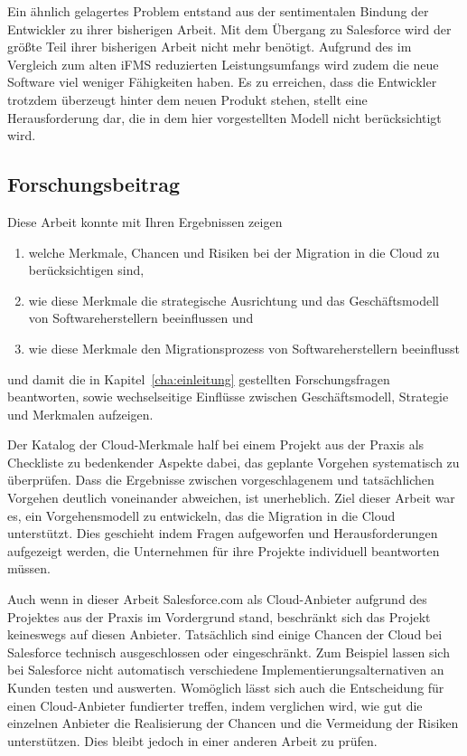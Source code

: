Ein ähnlich gelagertes Problem entstand aus der sentimentalen Bindung der 
Entwickler zu ihrer bisherigen Arbeit. Mit dem Übergang zu Salesforce wird der 
größte Teil ihrer bisherigen Arbeit nicht mehr benötigt. Aufgrund des im 
Vergleich zum alten iFMS reduzierten Leistungsumfangs wird zudem die neue 
Software viel weniger Fähigkeiten haben. Es zu erreichen, dass die Entwickler 
trotzdem überzeugt hinter dem neuen Produkt stehen, stellt eine Herausforderung 
dar, die in dem hier vorgestellten Modell nicht berücksichtigt wird.

\subsection{Forschungsbeitrag}
Diese Arbeit konnte mit Ihren Ergebnissen zeigen
\begin{enumerate}
	\item welche Merkmale, Chancen und Risiken bei der Migration in die 
Cloud zu berücksichtigen sind,
	\item wie diese Merkmale die strategische Ausrichtung und das 
Geschäftsmodell von Softwareherstellern beeinflussen und
	\item wie diese Merkmale den Migrationsprozess von Softwareherstellern 
beeinflusst
\end{enumerate}
und damit die in Kapitel~\ref{cha:einleitung} gestellten Forschungsfragen 
beantworten, sowie wechselseitige Einflüsse zwischen Geschäftsmodell, Strategie 
und Merkmalen aufzeigen.

Der Katalog der Cloud-Merkmale half bei einem Projekt aus der Praxis als 
Checkliste zu bedenkender Aspekte dabei, das geplante Vorgehen systematisch zu 
überprüfen. Dass die Ergebnisse zwischen vorgeschlagenem und tatsächlichen 
Vorgehen deutlich voneinander abweichen, ist unerheblich. Ziel dieser Arbeit war 
es, ein Vorgehensmodell zu entwickeln, das die Migration in die Cloud 
unterstützt. Dies geschieht indem Fragen aufgeworfen und Herausforderungen 
aufgezeigt werden, die Unternehmen für ihre Projekte individuell beantworten 
müssen. 

Auch wenn in dieser Arbeit Salesforce.com als Cloud-Anbieter aufgrund des 
Projektes aus der Praxis im Vordergrund stand, beschränkt sich das Projekt 
keineswegs auf diesen Anbieter. Tatsächlich sind einige Chancen der Cloud bei 
Salesforce technisch ausgeschlossen oder eingeschränkt. Zum Beispiel lassen 
sich bei Salesforce nicht automatisch verschiedene Implementierungsalternativen 
an Kunden testen und auswerten. 
Womöglich lässt sich auch die Entscheidung für 
einen Cloud-Anbieter fundierter treffen, indem verglichen wird, wie gut die 
einzelnen Anbieter die Realisierung der Chancen und die Vermeidung der Risiken 
unterstützen. Dies bleibt jedoch in einer anderen Arbeit zu prüfen.

